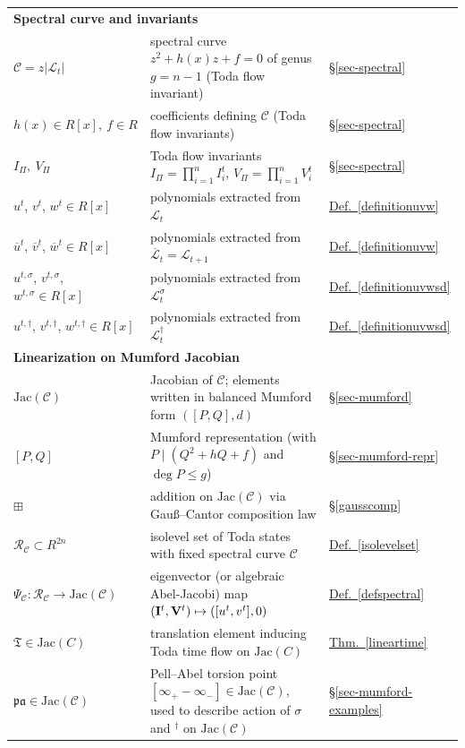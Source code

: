 \documentclass[11pt, a4paper]{amsart}
\newcommand{\jac}{\mathrm{Jac(\mathcal C)}}
\theoremstyle{plain}
\numberwithin{equation}{section}
\begin{document}
\begin{table}[H]
\begin{tabular}{p{} p{} p{}}
\multicolumn{3}{l}{\textbf{Spectral curve and invariants}}\\
$\mathcal C = z \vert \mathcal L_t \vert$ 
& spectral curve $z^2+h(x)z+f=0$ of genus $g=n-1$ (Toda flow invariant)& \hyperref[sec-spectral]{\S\ref*{sec-spectral}} \\
$h(x)\in R[x],\ f\in R$ & coefficients defining $\mathcal C$ (Toda flow invariants)& \hyperref[sec-spectral]{\S\ref*{sec-spectral}} \\
$I_\Pi,\ V_\Pi$ & Toda flow invariants $I_\Pi=\prod_{i=1}^n I_i^t$, $V_\Pi=\prod_{i=1}^n V_i^t$ & \hyperref[sec-spectral]{\S\ref*{sec-spectral}} \\
$u^t$, $v^t$, $w^t \in R[x]$ & polynomials extracted from $\mathcal L_t$ & \hyperref[definitionuvw]{Def.~\ref*{definitionuvw}} \\
$\overline u^t$, $\overline v^t$, $\overline w^t \in R[x]$ & polynomials extracted from $\overline {\mathcal L}_t=\mathcal L_{t+1}$ & \hyperref[definitionuvw]{Def.~\ref*{definitionuvw}} \\
$u^{t,\sigma}$, $v^{t,\sigma}$, $w^{t,\sigma} \in R[x]$ & polynomials extracted from $\mathcal L_t^\sigma$ & \hyperref[definitionuvwsd]{Def.~\ref*{definitionuvwsd}} \\
$u^{t,\dagger}$, $v^{t,\dagger}$, $w^{t,\dagger} \in R[x]$ & polynomials extracted from $\mathcal L_t^\dagger$ & \hyperref[definitionuvwsd]{Def.~\ref*{definitionuvwsd}} \\
\hline

\multicolumn{3}{l}{\textbf{Linearization on Mumford Jacobian}}\\
$\jac$ & Jacobian of $\mathcal C$; elements written in balanced Mumford form $([P,Q],d)$ & \hyperref[sec-mumford]{\S\ref*{sec-mumford}} \\
$[P,Q]$ & Mumford representation (with $P\mid(Q^2+hQ+f)$ and $\deg P\le g$) & \hyperref[sec-mumford-repr]{\S\ref*{sec-mumford-repr}} \\
$\boxplus$ & addition on $\jac$ via Gau{\ss}--Cantor composition law & \hyperref[gausscomp]{\S\ref*{gausscomp}} \\
$\mathcal R _\mathcal C \subset R^{2n}$ & isolevel set of Toda states with fixed spectral curve $\mathcal C$ & \hyperref[isolevelset]{Def.~\ref*{isolevelset}} \\
$\Psi_\mathcal C: \mathcal R_\mathcal C\to\mathrm{Jac}(\mathcal C)$ & eigenvector (or algebraic Abel-Jacobi) map $(\bold I ^t,\bold V ^t)\mapsto([u^t,v^t],0)$ & \hyperref[defspectral]{Def.~\ref*{defspectral}} \\
$\mathfrak T\in\mathrm{Jac}(C)$ & translation element inducing Toda time flow on $\mathrm{Jac}(C)$ & \hyperref[lineartime]{Thm.~\ref*{lineartime}} \\
$\mathfrak{pa} \in \jac$ & Pell--Abel torsion point $[\infty_+-\infty_-]\in\mathrm{Jac}(\mathcal C)$, used to describe action of $\sigma$ and ${}^\dagger$ on $\jac$ & \hyperref[sec-mumford-examples]{\S\ref*{sec-mumford-examples}} \\
\hline


\end{tabular}
\end{table}
\end{document}
